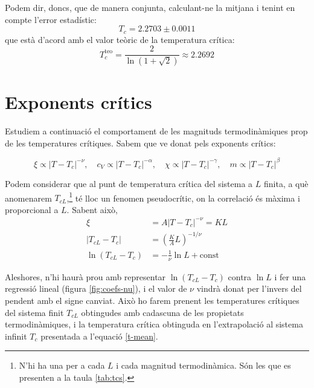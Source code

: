 \documentclass[a4paper]{article}
\begin{document}
Podem dir, doncs, que de manera conjunta, calculant-ne la mitjana i tenint en compte l'error estadístic:
\begin{equation} \label{t-mean}
    T_c = 2.2703 \pm 0.0011
\end{equation}
que està d'acord amb el valor teòric de la temperatura crítica:
\begin{equation*} \label{t-teo}
    T_c^\text{teo} = \frac{2}{\ln(1+\sqrt{2})} \approx 2.2692
\end{equation*}

\section{Exponents crítics}

Estudiem a continuació el comportament de les magnituds termodinàmiques prop de les temperatures crítiques. Sabem que ve donat pels exponents crítics:

\begin{equation*}
    \xi \propto \left| T-T_c \right|^{-\nu},\quad
    c_V \propto \left| T-T_c \right|^{-\alpha},\quad
    \chi \propto \left| T-T_c \right|^{-\gamma},\quad
    m \propto \left| T-T_c \right|^{\beta}
\end{equation*}

Podem considerar que al punt de temperatura crítica del sistema a $L$ finita, a què anomenarem $T_{cL}$,\footnote{N'hi ha una per a cada $L$ i cada magnitud termodinàmica. Són les que es presenten a la taula \ref{tab:tcs}.} té lloc un fenomen pseudocrític, on la correlació és màxima i proporcional a $L$. Sabent això,
\begin{align*}
    \xi &= A \left| T-T_c \right|^{-\nu} = KL \\
    \left|T_{cL}-T_c \right| &= \left(\frac{K}{A} L \right)^{-1/\nu} \\
    \ln \left(T_{cL} - T_c \right) &= -\frac{1}{\nu} \ln L + \text{const}
\end{align*}

Aleshores, n'hi haurà prou amb representar $\ln(T_{cL}-T_c)$ contra $\ln L$ i fer una regressió lineal (figura \ref{fig:coefs-nu}), i el valor de $\nu$ vindrà donat per l'invers del pendent amb el signe canviat. Això ho farem prenent les temperatures crítiques del sistema finit $T_{cL}$ obtingudes amb cadascuna de les propietats termodinàmiques, i la temperatura crítica obtinguda en l'extrapolació al sistema infinit $T_c$ presentada a l'equació \eqref{t-mean}.
\end{document}

